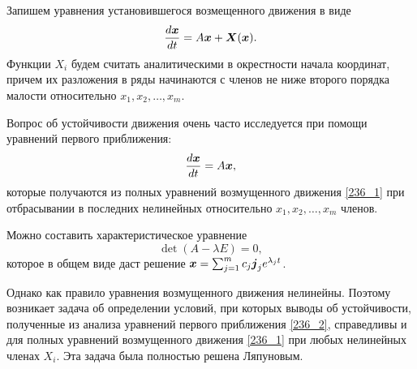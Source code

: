 Запишем уравнения установившегося возмещенного движения в виде
\begin{equation}
	\frac{d \mbox{\boldmath $x$}}{d t} = A \mbox{\boldmath $x$} + \mbox{\boldmath $X$}(\mbox{\boldmath $x$}).
	\label{236_1}
\end{equation}
Функции $X_i$ будем считать аналитическими в окрестности начала координат, причем их разложения в ряды начинаются с членов не ниже второго порядка малости относительно $x_1, x_2, \ldots, x_m$.

Вопрос об устойчивости движения очень часто исследуется при помощи уравнений первого приближения:
\begin{equation}
	\frac{d \mbox{\boldmath $x$}}{d t} = A \mbox{\boldmath $x$},
	\label{236_2}
\end{equation}
которые получаются из полных уравнений возмущенного движения \eqref{236_1} при отбрасывании в последних нелинейных относительно $x_1, x_2, \ldots, x_m$ членов.

Можно составить характеристическое уравнение
\begin{equation}
	\det(A - \lambda E) = 0,
	\label{236_3}
\end{equation}
которое в общем виде даст решение $\mbox{\boldmath $x$} = \sum_{j=1}^m c_j \mbox{\boldmath $j$}_j e^{\lambda_j t}$.


Однако как правило уравнения возмущенного движения нелинейны. Поэтому возникает задача об определении условий, при которых выводы об устойчивости, полученные из анализа уравнений первого приближения \eqref{236_2}, справедливы и для полных уравнений возмущенного движения \eqref{236_1} при любых нелинейных членах $X_i$. Эта задача была полностью решена Ляпуновым.